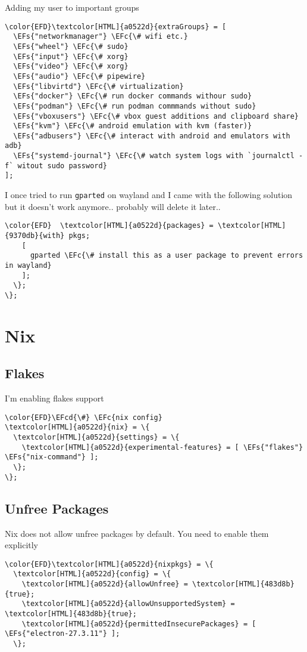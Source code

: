 \documentclass[14pt]{article}
\newcommand{\EFc}[1]{\textcolor{EFc}{#1}} %
\newcommand{\EFcd}[1]{\textcolor{EFcd}{#1}} %
\newcommand{\EFs}[1]{\textcolor{EFs}{#1}} %
\begin{document}
Adding my user to important groups
\begin{Code}
\begin{Verbatim}
\color{EFD}\textcolor[HTML]{a0522d}{extraGroups} = [
  \EFs{"networkmanager"} \EFc{\# wifi etc.}
  \EFs{"wheel"} \EFc{\# sudo}
  \EFs{"input"} \EFc{\# xorg}
  \EFs{"video"} \EFc{\# xorg}
  \EFs{"audio"} \EFc{\# pipewire}
  \EFs{"libvirtd"} \EFc{\# virtualization}
  \EFs{"docker"} \EFc{\# run docker commands withour sudo}
  \EFs{"podman"} \EFc{\# run podman commmands without sudo}
  \EFs{"vboxusers"} \EFc{\# vbox guest additions and clipboard share}
  \EFs{"kvm"} \EFc{\# android emulation with kvm (faster)}
  \EFs{"adbusers"} \EFc{\# interact with android and emulators with adb}
  \EFs{"systemd-journal"} \EFc{\# watch system logs with `journalctl -f` witout sudo password}
];
\end{Verbatim}
\end{Code}

I once tried to run \texttt{gparted} on wayland and I came with the following solution but it doesn't work anymore.. probably will delete it later..
\begin{Code}
\begin{Verbatim}
\color{EFD}  \textcolor[HTML]{a0522d}{packages} = \textcolor[HTML]{9370db}{with} pkgs;
    [
      gparted \EFc{\# install this as a user package to prevent errors in wayland}
    ];
  \};
\};
\end{Verbatim}
\end{Code}
\section{Nix}
\label{sec:orgc3141d0}
\subsection{Flakes}
\label{sec:orgea15999}
I'm enabling flakes support
\begin{Code}
\begin{Verbatim}
\color{EFD}\EFcd{\#} \EFc{nix config}
\textcolor[HTML]{a0522d}{nix} = \{
  \textcolor[HTML]{a0522d}{settings} = \{
    \textcolor[HTML]{a0522d}{experimental-features} = [ \EFs{"flakes"} \EFs{"nix-command"} ];
  \};
\};
\end{Verbatim}
\end{Code}
\subsection{Unfree Packages}
\label{sec:org500721e}
Nix does not allow unfree packages by default. You need to enable them explicitly
\begin{Code}
\begin{Verbatim}
\color{EFD}\textcolor[HTML]{a0522d}{nixpkgs} = \{
  \textcolor[HTML]{a0522d}{config} = \{
    \textcolor[HTML]{a0522d}{allowUnfree} = \textcolor[HTML]{483d8b}{true};
    \textcolor[HTML]{a0522d}{allowUnsupportedSystem} = \textcolor[HTML]{483d8b}{true};
    \textcolor[HTML]{a0522d}{permittedInsecurePackages} = [ \EFs{"electron-27.3.11"} ];
  \};
\end{Verbatim}
\end{Code}
\end{document}
